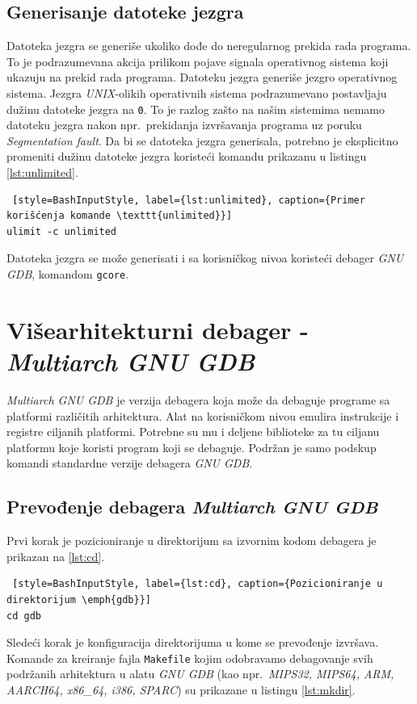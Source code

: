 \documentclass[12pt,oneside]{memoir}
\begin{document}
\subsection{Generisanje datoteke jezgra}

Datoteka jezgra se generiše ukoliko dođe do neregularnog prekida rada programa. To je podrazumevana akcija prilikom pojave signala operativnog sistema koji ukazuju na prekid rada programa. Datoteku jezgra generiše jezgro operativnog sistema. Jezgra \emph{UNIX}-olikih operativnih sistema podrazumevano postavljaju dužinu datoteke jezgra na \texttt{0}. To je razlog zašto na našim sistemima nemamo datoteku jezgra nakon npr.~prekidanja izvršavanja programa uz poruku \emph{Segmentation fault}. Da bi se datoteka jezgra generisala, potrebno je eksplicitno promeniti dužinu datoteke jezgra koristeći komandu prikazanu u listingu \ref{lst:unlimited}.

\begin{lstlisting} [style=BashInputStyle, label={lst:unlimited}, caption={Primer korišćenja komande \texttt{unlimited}}]
ulimit -c unlimited

\end{lstlisting}

Datoteka jezgra se može generisati i sa korisničkog nivoa koristeći debager \emph{GNU GDB}, komandom \texttt{gcore}.

\section{Višearhitekturni debager - \emph{Multiarch GNU GDB}}

\emph{Multiarch GNU GDB} je verzija debagera koja može da debaguje programe sa platformi različitih arhitektura. Alat na korisničkom nivou emulira instrukcije i registre ciljanih platformi. Potrebne su mu i deljene biblioteke za tu ciljanu platformu koje koristi program koji se debaguje. Podržan je samo podskup komandi standardne verzije debagera \emph{GNU GDB}.

\subsection{Prevođenje debagera \emph{Multiarch GNU GDB}}

Prvi korak je pozicioniranje u direktorijum sa izvornim kodom debagera je prikazan na \ref{lst:cd}.
\begin{lstlisting} [style=BashInputStyle, label={lst:cd}, caption={Pozicioniranje u direktorijum \emph{gdb}}]
cd gdb
\end{lstlisting}
Sledeći korak je konfiguracija direktorijuma u kome se prevođenje izvršava. Komande za kreiranje fajla \texttt{Makefile} kojim odobravamo debagovanje svih podržanih arhitektura u alatu \emph{GNU GDB} (kao npr.~\emph{MIPS32, MIPS64, ARM, AARCH64, x86\_64, i386, SPARC}) su prikazane u listingu \ref{lst:mkdir}.
\end{document}
